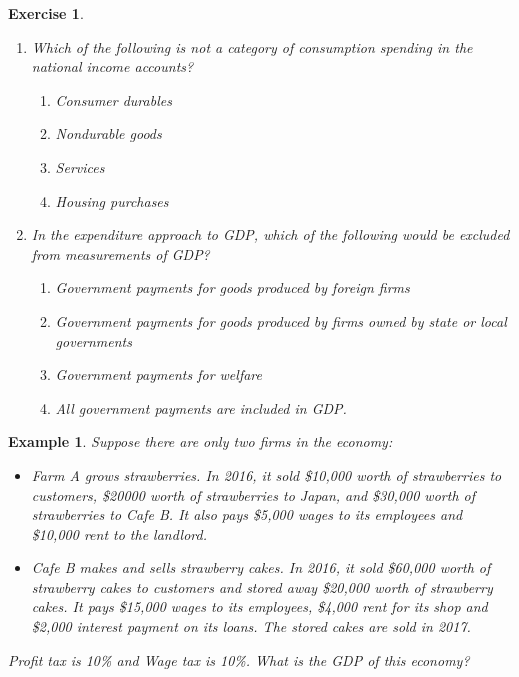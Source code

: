 \documentclass[12pt]{article}
\newtheorem{example}{Example}
\newtheorem{exercise}{Exercise}
\numberwithin{equation}{section}
\begin{document}
\begin{exercise}
    \begin{enumerate}[label=(\arabic*)]
        \item Which of the following is not a category of consumption spending in the national income accounts?
        \begin{enumerate}[label=\Alph*.]
            \item Consumer durables
            \item Nondurable goods
            \item Services
            \item Housing purchases
        \end{enumerate}
        \item In the expenditure approach to GDP, which of the following would be excluded from measurements of GDP?
        \begin{enumerate}[label=\Alph*.]
            \item Government payments for goods produced by foreign firms
            \item Government payments for goods produced by firms owned by state or local governments
            \item Government payments for welfare 
            \item All government payments are included in GDP.
        \end{enumerate}
    \end{enumerate}
\end{exercise}


\begin{example}
    Suppose there are only two firms in the economy:
    \begin{itemize}
        \item Farm A grows strawberries. In 2016, it sold \$10,000 worth of strawberries to customers, \$20000 worth of strawberries to Japan, and \$30,000 worth of strawberries to Cafe B. It also pays \$5,000 wages to its employees and \$10,000 rent to the landlord.
        \item Cafe B makes and sells strawberry cakes. In 2016, it sold \$60,000 worth of strawberry cakes to customers and stored away \$20,000 worth of strawberry cakes. It pays \$15,000 wages to its employees, \$4,000 rent for its shop and \$2,000 interest payment on its loans. The stored cakes are sold in 2017.
    \end{itemize}
    Profit tax is 10\% and Wage tax is 10\%. What is the GDP of this economy?
\end{example}
\end{document}
